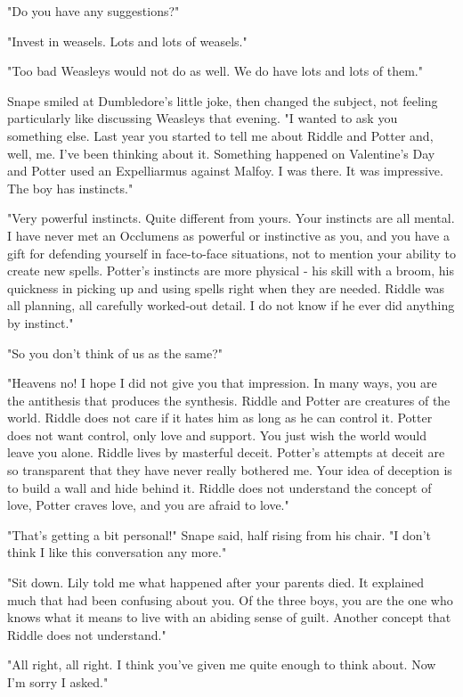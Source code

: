 "Do you have any suggestions?"

"Invest in weasels. Lots and lots of weasels."

"Too bad Weasleys would not do as well. We do have lots and lots of them."

Snape smiled at Dumbledore's little joke, then changed the subject, not feeling particularly like discussing Weasleys that evening. "I wanted to ask you something else. Last year you started to tell me about Riddle and Potter and, well, me. I've been thinking about it. Something happened on Valentine's Day and Potter used an Expelliarmus against Malfoy. I was there. It was impressive. The boy has{\el} instincts."

"Very powerful instincts. Quite different from yours. Your instincts are all mental. I have never met an Occlumens as powerful or instinctive as you, and you have a gift for defending yourself in face-to-face situations, not to mention your ability to create new spells. Potter's instincts are more physical - his skill with a broom, his quickness in picking up and using spells right when they are needed. Riddle was all planning, all carefully worked-out detail. I do not know if he ever did anything by instinct."

"So you don't think of us as the same?"

"Heavens no! I hope I did not give you that impression. In many ways, you are the antithesis that produces the synthesis. Riddle and Potter are creatures of the world. Riddle does not care if it hates him as long as he can control it. Potter does not want control, only love and support. You just wish the world would leave you alone. Riddle lives by masterful deceit. Potter's attempts at deceit are so transparent that they have never really bothered me. Your idea of deception is to build a wall and hide behind it. Riddle does not understand the concept of love, Potter craves love, and you are afraid to love."

"That's getting a bit personal!" Snape said, half rising from his chair. "I don't think I like this conversation any more."

"Sit down. Lily told me what happened after your parents died. It explained much that had been confusing about you. Of the three boys, you are the one who knows what it means to live with an abiding sense of guilt. Another concept that Riddle does not understand."

"All right, all right. I think you've given me quite enough to think about. Now I'm sorry I asked."

